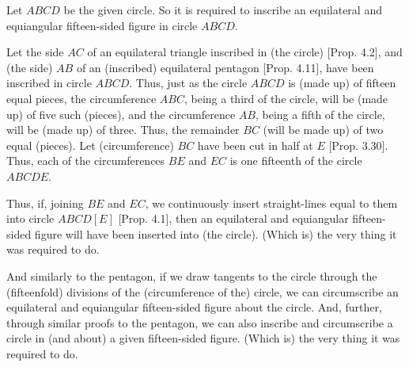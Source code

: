 \begin{Parallel}{}{}
{Let $ABCD$ be the given circle. So it is required to inscribe an equilateral
and equiangular fifteen-sided figure in circle $ABCD$.

Let the side $AC$ of an equilateral triangle inscribed in (the circle) [Prop. 4.2],
and (the side) $AB$ of an (inscribed) equilateral pentagon [Prop. 4.11],
 have been inscribed in circle $ABCD$.
 Thus,   just as the circle $ABCD$ is (made up) of fifteen equal pieces, the
 circumference $ABC$, being a third of the circle, will be (made up) of five
 such (pieces), and the
 circumference $AB$, being a fifth of the circle, will be (made up) of  three.
 Thus, the remainder $BC$ (will be made up) of two equal (pieces).
 Let (circumference) $BC$ have been cut in half at $E$ [Prop. 3.30].
 Thus, each of the circumferences $BE$ and $EC$ is one fifteenth of the circle
 $ABCDE$.
 
 Thus, if, joining $BE$ and $EC$, we continuously insert straight-lines
 equal to them into circle $ABCD[E]$ [Prop. 4.1],
 then an equilateral and equiangular fifteen-sided figure will have been
 inserted into (the circle). (Which is) the very thing it was required to do.
 
 And similarly to the pentagon, if we draw  tangents to the circle through
the (fifteenfold) divisions of the (circumference of the) circle, we can
circumscribe an equilateral and equiangular fifteen-sided figure about
the circle. 
 And, further, through similar proofs to the  pentagon,
 we can also inscribe and circumscribe  a circle in (and about)  a given fifteen-sided 
  figure. (Which is) the very thing it was required to do.}
\end{Parallel}
\newpage
\thispagestyle{plain}~\\